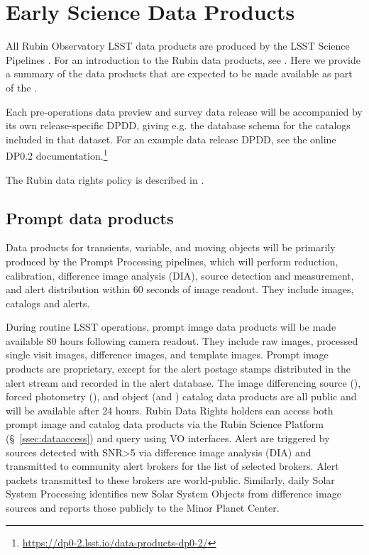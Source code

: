 \section{Early Science Data Products}
\label{sec:data}

All Rubin Observatory LSST data products are produced by the LSST Science Pipelines \cite{2019ASPC..523..521B,2018PASJ...70S...5B}. 
For an introduction to the Rubin data products, see \citet{RubinDataProductsAbridged}.
Here we provide a summary of the data products that are expected to be made available as part of the \esp.

Each pre-operations data preview and survey data release will be accompanied by its own release-specific DPDD, giving e.g. the  database schema for the catalogs included in that dataset.
For an example data release DPDD, see the online DP0.2 documentation.\footnote{\url{https://dp0-2.lsst.io/data-products-dp0-2/}}

The Rubin data rights policy is described in  \cite{RDO-013}.

\subsection{Prompt data products}

Data products for transients, variable, and moving objects will be primarily produced by the Prompt Processing pipelines, which will perform reduction, calibration, difference image analysis (DIA), source detection and measurement, and alert distribution within 60 seconds of image readout. 
They include images, catalogs and alerts. 

During routine LSST operations, prompt image data products will be made available 80 hours following camera readout. 
They include raw images, processed single visit images, difference images, and template images. 
Prompt image products are proprietary, except for the alert postage stamps distributed in the alert stream and recorded in the alert database.
The image differencing source (\DIASource), forced photometry (\DIAForcedSource), and object (\DIAObject and \SSObject)
catalog data products are all public and will be available after 24 hours. 
Rubin Data Rights holders can access both prompt image and catalog data products via the Rubin Science Platform (\S~\ref{ssec:dataaccess}) and query using VO interfaces. 
Alert are triggered by sources detected with SNR>5 via difference image analysis (DIA) and transmitted to community alert brokers for the list of selected brokers.
Alert packets transmitted to these brokers are world-public.
Similarly, daily Solar System Processing identifies new Solar System Objects from difference image sources and reports those publicly to the Minor Planet Center.


